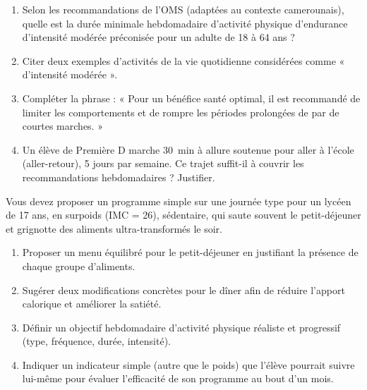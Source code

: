 \documentclass[11pt]{article}
\begin{document}
\begin{exercice}
\begin{enumerate}
    \item Selon les recommandations de l'OMS (adaptées au contexte camerounais), quelle est la durée minimale hebdomadaire d'activité physique d'endurance d'intensité modérée préconisée pour un adulte de 18 à 64 ans ?
    \item Citer deux exemples d'activités de la vie quotidienne considérées comme « d'intensité modérée ».
    \item Compléter la phrase : « Pour un bénéfice santé optimal, il est recommandé de limiter les comportements \underline{\hspace{4cm}} et de rompre les périodes prolongées de \underline{\hspace{4cm}} par de courtes marches. »
    \item Un élève de Première D marche \SI{30}{\minute} à allure soutenue pour aller à l'école (aller-retour), 5 jours par semaine. Ce trajet suffit-il à couvrir les recommandations hebdomadaires ? Justifier.
\end{enumerate}
\end{exercice}

\begin{exercice}
Vous devez proposer un programme simple sur une journée type pour un lycéen de 17 ans, en surpoids (IMC = 26), sédentaire, qui saute souvent le petit-déjeuner et grignotte des aliments ultra-transformés le soir.
\begin{enumerate}
    \item Proposer un menu équilibré pour le petit-déjeuner en justifiant la présence de chaque groupe d'aliments.
    \item Sugérer deux modifications concrètes pour le dîner afin de réduire l'apport calorique et améliorer la satiété.
    \item Définir un objectif hebdomadaire d'activité physique réaliste et progressif (type, fréquence, durée, intensité).
    \item Indiquer un indicateur simple (autre que le poids) que l'élève pourrait suivre lui-même pour évaluer l'efficacité de son programme au bout d'un mois.
\end{enumerate}
\end{exercice}
\end{document}
